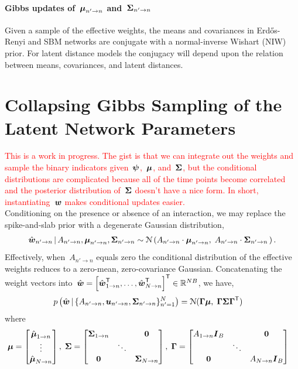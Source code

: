\documentclass[aos]{imsart} %
\begin{document}
\paragraph{Gibbs updates of~$\boldsymbol{\mu}_{n' \to n}$ and~$\boldsymbol{\Sigma}_{n' \to n}$} 
Given a sample of the effective weights, the means and covariances in Erd\H{o}s-Renyi and SBM networks are conjugate with a normal-inverse Wishart (NIW) prior. For latent distance models the conjugacy will depend upon the relation between means, covariances, and latent distances.

\section{Collapsing Gibbs Sampling of the Latent Network Parameters}
{\textcolor{red} {This is a work in progress. The gist is that we can integrate out the weights and sample the binary indicators given~$\boldsymbol{\psi}$,~$\boldsymbol{\mu}$, and~$\boldsymbol{\Sigma}$, but the conditional distributions are complicated because all of the time points become correlated and the posterior distribution of~$\boldsymbol{\Sigma}$ doesn't have a nice form. In short, instantiating~$\boldsymbol{w}$ makes conditional updates easier. }}
\\
Conditioning on the presence or absence of an interaction, we may replace the spike-and-slab prior with a degenerate Gaussian distribution,
\begin{align}
\hat{\bw}_{n' \to n} \given A_{n' \to n}, \bmu_{n' \to n}, \bSigma_{n' \to n} \sim \distNormal \left(A_{n' \to n} \cdot \bmu_{n' \to n},\;A_{n' \to n} \cdot \bSigma_{n' \to n} \,\right).
\end{align}
Effectively, when~${A_{n'\to n}}$ equals zero the conditional distribution of the effective weights reduces to a zero-mean, zero-covariance Gaussian.  Concatenating the weight vectors into~${\hat{\boldsymbol{w}} = \left[\hat{\boldsymbol{w}}_{1 \to n}^{\mathsf{T}}, \ldots, \hat{\boldsymbol{w}}_{N \to n}^{\mathsf{T}}\right]^{\mathsf{T}} \in \mathbb{R}^{NB}}$, we have,
\begin{align}
p\left(\hat{\bw} \given \{A_{n'\to n}, \bu_{n' \to n}, \bSigma_{n' \to n}\}_{n'=1}^N \right) &= \distNormal(\bGamma\bmu, \; \bGamma\bSigma\bGamma^\trans) 
\end{align}
where
\begin{align}
\bmu = \begin{bmatrix} \hat{\bmu}_{1 \to n} \\ \vdots \\ \hat{\bmu}_{N \to n} \end{bmatrix},\;  
\bSigma &= 
	\begin{bmatrix} \bSigma_{1 \to n} &         & \boldsymbol{0} \\
		                              & \ddots  &        \\
		            \boldsymbol{0}    &         & \bSigma_{N \to n} 
	\end{bmatrix}, 
\;
\bGamma = 
	\begin{bmatrix} A_{1 \to n} \bI_B &         & \boldsymbol{0} \\
		                              & \ddots  &        \\
		            \boldsymbol{0}    &         & A_{N \to n} \bI_B 
	\end{bmatrix}
\end{align}
\end{document}

